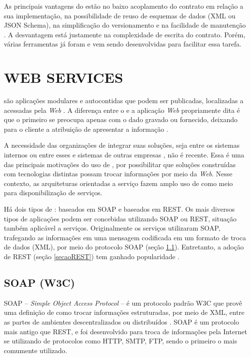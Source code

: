 As principais vantagens do \CtFirst{} estão no baixo acoplamento do contrato em
relação a sua implementação, na possibilidade de reuso de esquemas de dados (XML
ou JSON Schema), na simplificação do versionamento e na facilidade de manutenção
\cite{karthikeyancontract}. A desvantagem está justamente na complexidade de
escrita do contrato. Porém, várias ferramentas já foram e vem sendo
desenvolvidas para facilitar essa tarefa.


\section{WEB SERVICES}
\vspace{-6mm}

\ws{} são aplicações modulares e autocontidas que podem ser publicadas,
localizadas a acessadas pela \textit{Web} \cite{alonso2004web}. A diferença
entre o \ws{} e a aplicação \textit{Web} propriamente dita é que o primeiro se
preocupa apenas com o dado gravado ou fornecido, deixando para o cliente a atribuição de apresentar a
informação \cite{serrano2014service}.

A necessidade das organizações de integrar suas soluções, seja
entre os sistemas internos ou entre esses e sistemas de outras empresas
\cite{rao2004survey}, não é recente. Essa é uma das principais motivações do uso
de \ws{}, por possibilitar que soluções construídas com tecnologias distintas
possam trocar informações por meio da \textit{Web}. Nesse contexto, as arquiteturas
orientadas a serviço fazem amplo uso de \ws{} como meio para disponibilização de serviços.

Há dois tipos de \ws{}: baseados em SOAP e baseados em REST. Os mais diversos
tipos de aplicações podem ser concebidas utilizando \wss{} SOAP ou REST,
situação também aplicável a serviços.
Originalmente os serviços utilizaram \ws{} SOAP, trafegando as informações em
uma mensagem codificada em um formato de troca de dados (XML), por meio do
protocolo SOAP (seção \ref{secaoSOAP}). Entretanto, a adoção de \ws{} REST
(seção \ref{secaoREST}) tem ganhado popularidade \cite{mumbaikar2013web}.

\subsection{SOAP (W3C) }
\label{secaoSOAP}
\vspace{-6mm}

SOAP -- \textit{Simple Object Access Protocol} -- é um protocolo padrão W3C que
provê uma definição de como trocar informações estruturadas, por meio de XML, entre
as partes de ambientes descentralizados ou distribuídos \cite{WSDLSite}. SOAP
é um protocolo mais antigo que REST, e foi desenvolvido para troca de informações
pela Internet se utilizando de protocolos como HTTP, SMTP, FTP, sendo o primeiro
o mais comumente utilizado.

